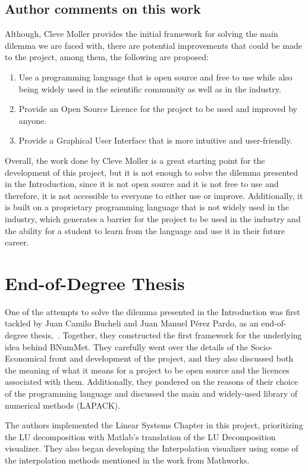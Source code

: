 \subsection{Author comments on this work}
Although, Cleve Moller provides the initial framework for solving the main dilemma we are faced with, there are potential improvements that could be made to the project, among them, the following are proposed:

\begin{enumerate}
    \item Use a programming language that is open source and free to use while also being widely used in the scientific community as well as in the industry.
    \item Provide an Open Source Licence for the project to be used and improved by anyone.
    \item Provide a Graphical User Interface that is more intuitive and user-friendly.
\end{enumerate}


Overall, the work done by Cleve Moller is a great starting point for the development of this project, but it is not enough to solve the dilemma presented in the Introduction, since it is not open source and it is not free to use and therefore, it is not accessible to everyone to either use or improve. Additionally, it is built on a proprietary programming language that is not widely used in the industry, which generates a barrier for the project to be used in the industry and the ability for a student to learn from the language and use it in their future career.


\section{End-of-Degree Thesis}
One of the attempts to solve the dilemma presented in the Introduction was first tackled by Juan Camilo Bucheli and Juan Manuel Pérez Pardo, as an end-of-degree thesis,~\cite{bucheli2020}. Together, they constructed the first framework for the underlying idea behind BNumMet.
They carefully went over the details of the Socio-Economical front and development of the project, and they also discussed both the meaning of what it means for a project to be open source and the licences associated with them. Additionally, they pondered on the reasons of their choice of the programming language and discussed the main and widely-used library of numerical methods (LAPACK).

The authors implemented the Linear Systems Chapter in this project, prioritizing the LU decomposition with Matlab's translation of the LU Decomposition visualizer. They also began developing the Interpolation visualizer using some of the interpolation methods mentioned in the work from Mathworks.

